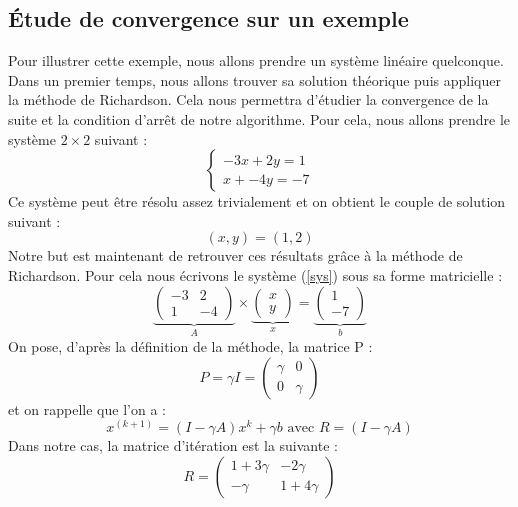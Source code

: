 \subsection{Étude de convergence sur un exemple}
Pour illustrer cette exemple, nous allons prendre un système linéaire quelconque. Dans un premier temps, nous allons trouver sa solution théorique puis appliquer la méthode de Richardson. Cela nous permettra d'étudier la convergence de la suite et la condition d'arrêt de notre algorithme. Pour cela, nous allons prendre le système $2\times 2$ suivant : 
\begin{equation}
\begin{cases}
-3x + 2y = 1\\
x + -4y = -7
\end{cases}
\label{sys}
\end{equation}
Ce système peut être résolu assez trivialement et on obtient le couple de solution suivant : \begin{equation}
(x, y) = (1, 2)
\end{equation}
Notre but est maintenant de retrouver ces résultats grâce à la méthode de Richardson. Pour cela nous écrivons le système (\ref{sys}) sous sa forme matricielle : 
\begin{equation}
\underbrace{\begin{pmatrix}
	-3 & 2 \\
	1 & -4
	\end{pmatrix}}_{A} 
\times 
\underbrace{\begin{pmatrix}
	x \\ y
	\end{pmatrix} }_{x} 
=
\underbrace{\begin{pmatrix}
	1 \\ -7
	\end{pmatrix}}_{b}  
\end{equation}
On pose, d'après la définition de la méthode, la matrice P : 
\begin{equation}
P = \gamma I = 
\begin{pmatrix}
\gamma & 0 \\
0 & \gamma
\end{pmatrix}
\end{equation}
et on rappelle que l'on a : 
\begin{equation}
x^{(k+1)} = (I - \gamma A)x^{k} + \gamma b \text{ avec } R = (I - \gamma A)
\end{equation}
Dans notre cas, la matrice d'itération est la suivante : 
\begin{equation}
R = 
\begin{pmatrix}
1 + 3\gamma   & -2\gamma \\
-\gamma & 1+4\gamma
\end{pmatrix}
\end{equation}
